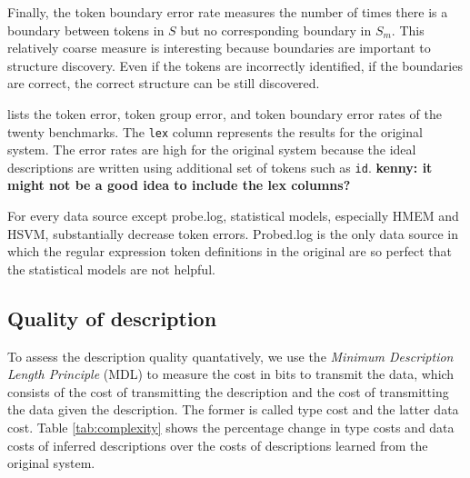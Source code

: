Finally, the token boundary error rate measures the number of times
there is a boundary between tokens in $S$ but no corresponding
boundary in $S_m$.  This relatively coarse measure is interesting
because boundaries are important to structure discovery. Even if the
tokens are incorrectly identified, if the boundaries are correct, the
correct structure can be still discovered.

 lists the token error, token group error, and token
boundary error rates of the twenty benchmarks.  The {\tt lex} column
represents the results for the original \learnpads{} system.
The error rates are
high for the original system because the ideal \pads{} descriptions are
written using additional set of tokens such as {\tt id}. 
{\bf kenny: it might not be a good idea to include the lex columns?}

For every data source except probe.log,
statistical models, especially HMEM and HSVM, substantially decrease token errors.
Probed.log is the only data source in which the regular expression
token definitions in the original \learnpads{} are so perfect that
the statistical models are not helpful.

\subsection{Quality of description}

To assess the description quality quantatively, we use the 
{\em Minimum Description Length Principle} (MDL) to 
measure the cost in bits to transmit the
data, which consists of the cost of transmitting the description and
the cost of transmitting the data given the description. The former
is called type cost and the latter data cost. Table \ref{tab:complexity}
shows the percentage change in type costs and data costs of
inferred descriptions over the costs of 
descriptions learned from the original \learnpads{} system.

